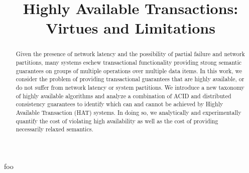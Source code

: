\documentclass{vldb}
\begin{document}

\title{Highly Available Transactions: Virtues and Limitations}

\maketitle

\begin{abstract}
Given the presence of network latency and the possibility of partial
failure and network partitions, many systems eschew transactional
functionality providing strong semantic guarantees on groups of
multiple operations over multiple data items. In this work, we
consider the problem of providing transactional guarantees that are
highly available, or do not suffer from network latency or system
partitions.  We introduce a new taxonomy of highly available
algorithms and analyze a combination of ACID and distributed
consistency guarantees to identify which can and cannot be achieved by
Highly Available Transaction (HAT) systems. In doing so, we
analytically and experimentally quantify the cost of violating high
availability as well as the cost of providing necessarily relaxed
semantics.
\end{abstract}


















foo~\cite{adya}


\footnotesize
  


\begin{appendix}

\end{appendix}
\end{document}
